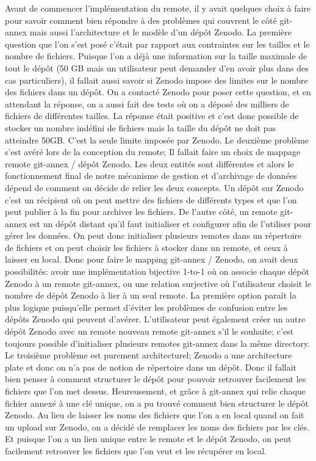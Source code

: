 \documentclass[11pt]{article}
\begin{document}
Avant de commencer l’implémentation du remote, il y avait quelques
choix à faire pour savoir comment bien répondre à des problèmes qui
couvrent le côté git-annex mais aussi l’architecture et le modèle d’un
dépôt Zenodo.
La première question que l’on s’est posé c’était par rapport aux
contraintes sur les tailles et le nombre de fichiers. Puisque l’on a
déjà une information sur la taille maximale de tout le dépôt (50 GB
mais un utilisateur peut demander d’en avoir plus dans des cas
particuliers), il fallait aussi savoir si Zenodo impose des limites
sur le nombre des fichiers dans un dépôt. On a contacté Zenodo pour
poser cette question, et en attendant la réponse, on a aussi fait des
tests où on a déposé des milliers de fichiers de différentes
tailles. La réponse était positive et c'est donc possible de stocker
un nombre indéfini de fichiers mais la taille du dépôt ne doit pas
atteindre 50GB. C'est la seule limite imposée par Zenodo.
Le deuxième problème s’est avéré lors de la conception du remote; Il
fallait faire un choix de mappage remote git-annex / dépôt Zenodo. Les
deux entités sont différentes et alors le fonctionnement final de
notre mécanisme de gestion et d’archivage de données dépend de comment
on décide de relier les deux concepts. Un dépôt sur Zenodo c’est un
récipient où on peut mettre des fichiers de différents types et que
l’on peut publier à la fin pour archiver les fichiers. De l’autre
côté, un remote git-annex est un dépôt distant qu’il faut initialiser
et configurer afin de l’utiliser pour gérer les données. On peut donc
initialiser plusieurs remotes dans un répertoire de fichiers et on
peut choisir les fichiers à stocker dans un remote, et ceux à laisser
en local. Donc pour faire le mapping git-annex / Zenodo, on avait deux
possibilités: avoir une implémentation bijective 1-to-1 où on associe
chaque dépôt Zenodo à un remote git-annex, ou une relation surjective
où l’utilisateur choisit le nombre de dépôt Zenodo à lier à un seul
remote. La première option paraît la plus logique puisqu’elle permet
d’éviter les problèmes de confusion entre les dépôts Zenodo qui
peuvent d’avérer. L’utilisateur peut également créer un autre dépôt
Zenodo avec un remote nouveau remote git-annex s’il le souhaite; c'est
toujours possible d'initialiser plusieurs remotes git-annex dans la
même directory.
Le troisième problème est purement architecturel; Zenodo a une
architecture plate et donc on n’a pas de notion de répertoire dans un
dépôt. Donc il fallait bien penser à comment structurer le dépôt pour
pouvoir retrouver facilement les fichiers que l’on met
dessus. Heureusement, et grâce à git-annex qui relie chaque fichier
annexé à une clé unique, on a pu trouvé comment bien structurer le
dépôt Zenodo. Au lieu de laisser les noms des fichiers que l’on a en
local quand on fait un upload sur Zenodo, on a décidé de remplacer les
noms des fichiers par les clés. Et puisque l’on a un lien unique entre
le remote et le dépôt Zenodo, on peut facilement retrouver les
fichiers que l’on veut et les récupérer en local.
\end{document}
